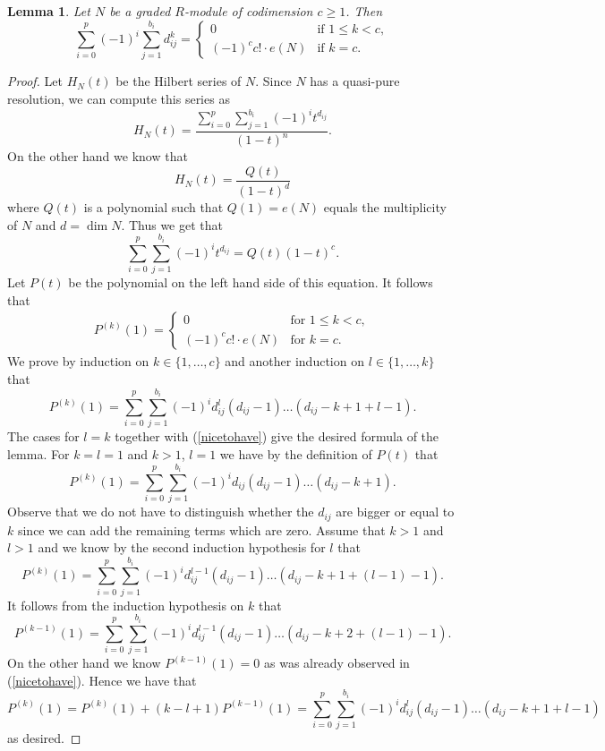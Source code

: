\documentclass[12pt,twoside]{amsart}
\numberwithin{equation}{section}
\newtheorem{lemma}[theorem]{Lemma}
\theoremstyle{definition}
\begin{document}
\begin{lemma}
\label{quasihelper} Let  $N$ be a graded $R$-module of codimension  $c\geq 1$. Then
$$
\sum_{i=0}^p (-1)^i \sum_{j=1}^{b_i} d_{ij}^k
=
\begin{cases}
0               & \text{if } 1\leq k < c,\\
(-1)^c c! \cdot e(N)  & \text{if } k=c.
\end{cases}
$$
\end{lemma}
\begin{proof}
Let $H_N(t)$ be the Hilbert series of $N$. Since $N$ has
a quasi-pure resolution, we can compute this series as
$$
H_N(t)
=
\frac{\sum_{i=0}^p \sum_{j=1}^{b_i} (-1)^it^{d_{ij}} }{(1-t)^n}.
$$
On the other hand we know that
$$
H_N(t) = \frac{Q(t)}{(1-t)^d}
$$
where $Q(t)$ is a polynomial such that $Q(1)=e(N)$ equals the multiplicity of $N$
and $d=\dim N$.
Thus we get that
$$
\sum_{i=0}^p \sum_{j=1}^{b_i} (-1)^i t^{d_{ij}}
=
Q(t) (1-t)^c.
$$
Let $P(t)$ be the polynomial on the left hand side of this equation.
It follows that
\begin{eqnarray}
\label{nicetohave}
P^{(k)}(1)
=
\begin{cases}
0 & \text{for } 1\leq k < c,\\
(-1)^c c! \cdot e(N)& \text{for } k=c.
\end{cases}
\end{eqnarray}
We prove by induction
on $k\in \{1,\dots, c\}$ and another induction on $l \in \{1,\dots, k\}$
that
$$
P^{(k)}(1)
=
\sum_{i=0}^p \sum_{j=1}^{b_i} (-1)^i d_{ij}^l(d_{ij}-1) \dots (d_{ij}-k+1 +l-1 ).
$$
The cases for $l=k$ together with (\ref{nicetohave}) give the desired formula of the lemma.
For $k=l=1$ and $k>1$, $l=1$ we have by the definition of $P(t)$ that
$$
P^{(k)}(1)
=
\sum_{i=0}^p \sum_{j=1}^{b_i} (-1)^i d_{ij}(d_{ij}-1) \dots (d_{ij}-k+1).
$$
Observe that we do not have to distinguish whether the $d_{ij}$
are bigger or equal to $k$ since we can add the remaining terms which are zero.
Assume that $k>1$ and $l>1$ and we know by the second induction hypothesis for $l$
that
$$
P^{(k)}(1)
=
\sum_{i=0}^p \sum_{j=1}^{b_i} (-1)^i d_{ij}^{l-1}(d_{ij}-1) \dots (d_{ij}-k+1 +(l-1)-1 ).
$$
It follows from the induction hypothesis on $k$ that
$$
P^{(k-1)}(1)
=
\sum_{i=0}^p \sum_{j=1}^{b_i} (-1)^i d_{ij}^{l-1}(d_{ij}-1) \dots (d_{ij}-k + 2 + (l-1)-1 ).
$$
On the other hand we know $P^{(k-1)}(1)=0$ as was already observed in (\ref{nicetohave}).
Hence we have that
$$
P^{(k)}(1)
=
P^{(k)}(1)
+
(k -l+1)
P^{(k-1)}(1)
=
\sum_{i=0}^p \sum_{j=1}^{b_i} (-1)^i d_{ij}^l(d_{ij}-1) \dots (d_{ij}-k+1 +l-1 )
$$
as desired.
\end{proof}
\end{document}

